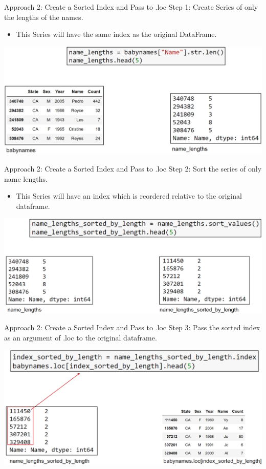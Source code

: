 \documentclass[aspectratio=169]{../latex_main/tntbeamer}  %
\begin{document}
	
	\begin{frame}[c]{Approach 2: Create a Sorted Index and Pass to .loc}
       Step 1: Create Series of only the lengths of the names.
        \begin{itemize}
            \item This Series will have the same index as the original DataFrame.
        \end{itemize}
	   \includegraphics[scale=.37]{Bild16}\\
	\end{frame}
	
	
	
	
	\begin{frame}[c]{Approach 2: Create a Sorted Index and Pass to .loc}
       Step 2: Sort the series of only name lengths.
        \begin{itemize}
            \item This Series will have an index which is reordered relative to the original dataframe.
        \end{itemize}
	   \includegraphics[scale=.37]{Bild17}\\
	\end{frame}
	
	
    \begin{frame}[c]{Approach 2: Create a Sorted Index and Pass to .loc}
       Step 3: Pass the sorted index as an argument of .loc to the original dataframe.

	   \includegraphics[scale=.37]{Bild18}\\
	\end{frame}
\end{document}
